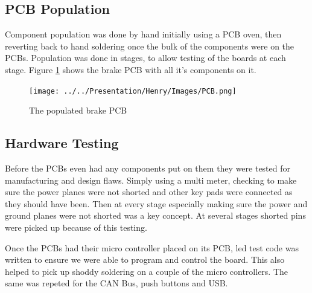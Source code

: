   \subsection{PCB Population}
  Component population was done by hand initially using a PCB oven, then
  reverting back to hand soldering once the bulk of the components were on the
  PCBs. Population was done in stages, to allow testing of the boards at each
  stage. Figure \ref{fullPCB} shows the brake PCB with all it's components on
  it.
  
  \begin{figure}[h]
      \centering
      \texttt{[image: ../../Presentation/Henry/Images/PCB.png]}
      \caption{The populated brake PCB}
      \label{fullPCB}
  \end{figure}

  \subsection{Hardware Testing}
  Before the PCBs even had any components put on them they were tested for
  manufacturing and design flaws. Simply using a multi meter, checking to make
  sure the power planes were not shorted and other key pads were connected as
  they should have been. Then at every stage especially making sure the power
  and ground planes were not shorted was a key concept. At several stages
  shorted pins were picked up because of this testing.

  Once the PCBs had their micro controller placed on its PCB, led test code was
  written to ensure we were able to program and control the board. This also
  helped to pick up shoddy soldering on a couple of the micro controllers. The
  same was repeted for the CAN Bus, push buttons and USB.

